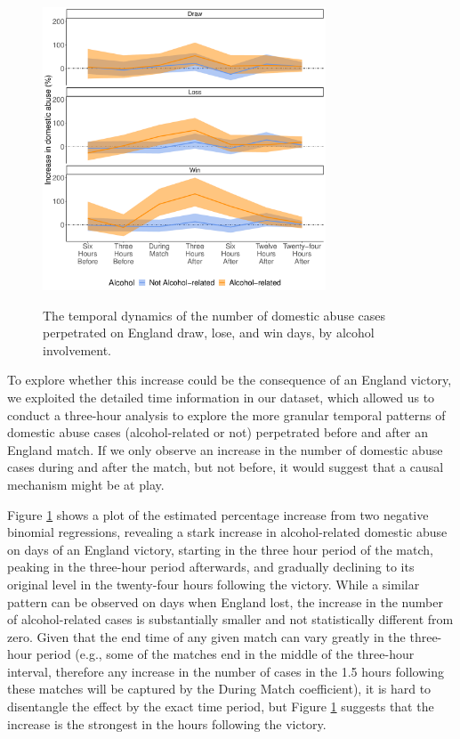\documentclass[12pt, a4paper]{article}
\begin{document}
 \begin{figure}[!htbp]
\centering
 \caption{The temporal dynamics of the number of domestic abuse cases perpetrated on England draw, lose, and win days, by alcohol involvement.}
\includegraphics[width=0.75\textwidth]{Threehours_newdata.pdf}
\label{fig:threehours}
\end{figure}
 
To explore whether this increase could be the consequence of an England victory, we exploited the detailed time information in our dataset, which allowed us to conduct a three-hour analysis to explore the more granular temporal patterns of domestic abuse cases (alcohol-related or not) perpetrated before and after an England match. If we only observe an increase in the number of domestic abuse cases during and after the match, but not before, it would suggest that a causal mechanism might be at play. 
 
 
  Figure \ref{fig:threehours} shows a plot of the estimated percentage increase from two negative binomial regressions, revealing a stark increase in alcohol-related domestic abuse on days of an England victory, starting in the three hour period of the match, peaking in the three-hour period afterwards, and gradually declining to its original level in the twenty-four hours following the victory. While a similar pattern can be observed on days when England lost, the increase in the number of alcohol-related cases is substantially smaller and not statistically different from zero. Given that the end time of any given match can vary greatly in the three-hour period (e.g., some of the matches end in the middle of the three-hour interval, therefore any increase in the number of cases in the 1.5 hours following these matches will be captured by the During Match coefficient), it is hard to disentangle the effect by the exact time period, but Figure \ref{fig:threehours} suggests that the increase is the strongest in the hours following the victory. 
 
\end{document}
